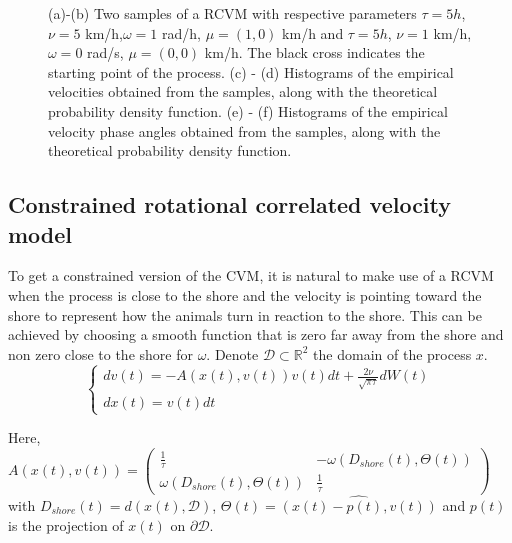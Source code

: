 \documentclass[11pt]{article}
\newcommand {\R}{\mathbb{R}}
\newcommand {\1}{\mathbb{1}}
\begin{document}
\begin{figure}[H]
\begin{subfigure}{0.48\textwidth}
	\caption{}
\end{subfigure}
	\caption{(a)-(b) Two samples of a RCVM with respective parameters $\tau=5 h$, $\nu=5$ km/h,$\omega=1$ rad/h, $\mu=(1,0)$ km/h  and $\tau=5 h$, $\nu=1$ km/h,$\omega=0$ rad/s, $\mu=(0,0)$ km/h. The black cross indicates the starting point of the process. (c) - (d) Histograms of the empirical velocities obtained from the samples, along with the theoretical probability density function. (e) - (f) Histograms of the empirical velocity phase angles obtained from the samples, along with the theoretical probability density function. }
	\label{fig: sample RACVM}
\end{figure}

\subsection{Constrained rotational correlated velocity model}
\label{section: CRCVM}

To get a constrained version of the CVM, it is natural to make use of a RCVM when the process is close to the shore and the velocity is pointing toward the shore to represent how the animals turn in reaction to the shore.
This can be achieved by choosing a smooth function that is zero far away from the shore and non zero close to the shore for $\omega$.
Denote $\mathcal{D} \subset \R^2$ the domain of the process $x$.
\begin{equation} \left\{
	\begin{array}{l}
		dv(t)=-A(x(t),v(t))v(t)dt+\frac{2\nu}{\sqrt{\pi \tau}} dW(t) \\
		dx(t)=v(t) dt
	\end{array}
	\right.
	\label{eq: CRCVM equation}
\end{equation}

Here, $A(x(t),v(t))=\begin{pmatrix} 
	\frac{1}{\tau} & -\omega(D_{shore}(t),\Theta(t)) \\
	\omega(D_{shore}(t),\Theta(t)) & \frac{1}{\tau}
\end{pmatrix}$
with $D_{shore}(t)=d(x(t),\mathcal{D})$,
 $\Theta(t)=\widehat{(x(t)-p(t),v(t))}$ and $p(t)$ is the projection of $x(t)$ on $\partial \mathcal{D}$.
 
\end{document}
